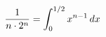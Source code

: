 \documentclass[preview]{standalone}
\begin{document}
\begin{align*}
\special{dvisvgm:raw <g id='unique000'>}\dfrac{1}{n\cdot 2^n}=\displaystyle\int_0^{1/2}x^{n-1}\,dx\special{dvisvgm:raw </g>}
\end{align*}
\end{document}
